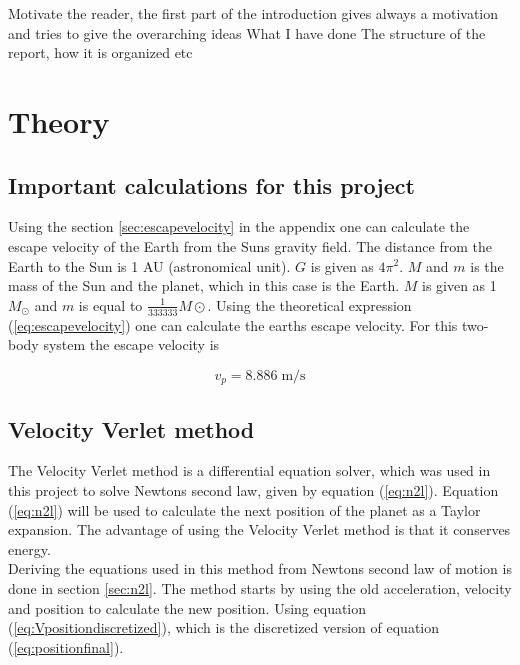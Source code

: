 \documentclass{article}
\begin{document}
Motivate the reader, the first part of the introduction gives always a motivation and tries to give the overarching ideas
What I have done
The structure of the report, how it is organized etc

\vspace{1cm}

\section{Theory} \label{sec:Theory}

\subsection{Important calculations for this project}

    Using the section \ref{sec:escapevelocity} in the appendix one can calculate the escape velocity of the Earth from the Suns gravity field. The distance from the Earth to the Sun is 1 AU (astronomical unit). $G$ is given as $4 \pi^{2}$. $M$ and $m$ is the mass of the Sun and the planet, which in this case is the Earth. $M$ is given as 1 $M_{\odot}$ and $m$ is equal to $\frac{1}{333333} M\odot$. Using the theoretical expression (\ref{eq:escapevelocity}) one can calculate the earths escape velocity. For this two-body system the escape velocity is

    \begin{equation}    \label{eq:theoretical escapevelocity}
        v_p = 8.886 \; \textrm{m/s}
    \end{equation}

\subsection{Velocity Verlet method}

    The Velocity Verlet method is a differential equation solver, which was used in this project to solve Newtons second law, given by equation (\ref{eq:n2l}). Equation (\ref{eq:n2l}) will be used to calculate the next position of the planet as a Taylor expansion. The advantage of using the Velocity Verlet method is that it conserves energy. \\

    Deriving the equations used in this method from Newtons second law of motion is done in section \ref{sec:n2l}. The method starts by using the old acceleration, velocity and position to calculate the new position. Using equation (\ref{eq:Vpositiondiscretized}), which is the discretized version of equation (\ref{eq:positionfinal}). \\
\end{document}
